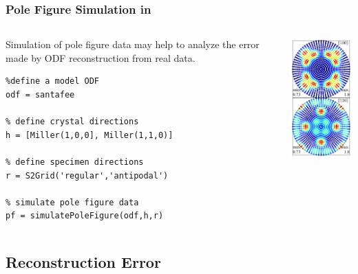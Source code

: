 \begin{frame}[fragile]
  \frametitle{Pole Figure Simulation in \mtex}

  \begin{columns}
    \begin{column}{8cm}

      Simulation of pole figure data may help to analyze the error made by ODF
      reconstruction from real data.

\begin{lstlisting}
%define a model ODF
odf = santafee

% define crystal directions
h = [Miller(1,0,0], Miller(1,1,0)]

% define specimen directions
r = S2Grid('regular','antipodal')

% simulate pole figure data
pf = simulatePoleFigure(odf,h,r)
\end{lstlisting}
    \end{column}

    \begin{column}{4cm}
      \centerline{
      \includegraphics[width=4cm]{pic/simpf}}
    \end{column}

  \end{columns}

\end{frame}

\subsection*{Reconstruction Error}

